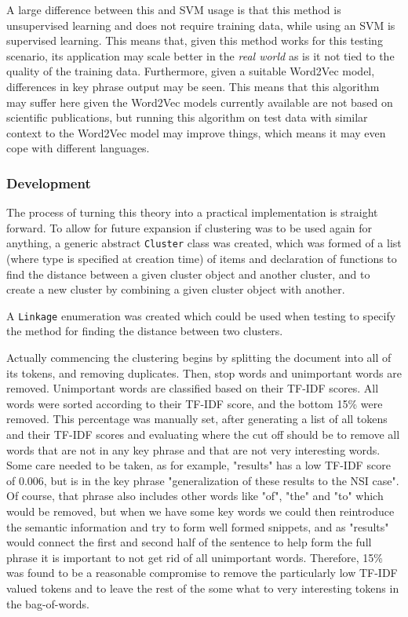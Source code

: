 A large difference between this and SVM usage is that this method is unsupervised learning and does not require training data, while using an SVM is supervised learning. This means that, given this method works for this testing scenario, its application may scale better in the \textit{real world} as is it not tied to the quality of the training data. Furthermore, given a suitable Word2Vec model, differences in key phrase output may be seen. This means that this algorithm may suffer here given the Word2Vec models currently available are not based on scientific publications, but running this algorithm on test data with similar context to the Word2Vec model may improve things, which means it may even cope with different languages.

\subsubsection*{Development}
The process of turning this theory into a practical implementation is straight forward. To allow for future expansion if clustering was to be used again for anything, a generic abstract \texttt{Cluster} class was created, which was formed of a list (where type is specified at creation time) of items and declaration of functions to find the distance between a given cluster object and another cluster, and to create a new cluster by combining a given cluster object with another.

A \texttt{Linkage} enumeration was created which could be used when testing to specify the method for finding the distance between two clusters.

Actually commencing the clustering begins by splitting the document into all of its tokens, and removing duplicates. Then, stop words and unimportant words are removed. Unimportant words are classified based on their TF-IDF scores. All words were sorted according to their TF-IDF score, and the bottom 15\% were removed. This percentage was manually set, after generating a list of all tokens and their TF-IDF scores and evaluating where the cut off should be to remove all words that are not in any key phrase and that are not very interesting words. Some care needed to be taken, as for example, "results" has a low TF-IDF score of 0.006, but is in the key phrase "generalization of these results to the NSI case". Of course, that phrase also includes other words like "of", "the" and "to" which would be removed, but when we have some key words we could then reintroduce the semantic information and try to form well formed snippets, and as "results" would connect the first and second half of the sentence to help form the full phrase it is important to not get rid of all unimportant words. Therefore, 15\% was found to be a reasonable compromise to remove the particularly low TF-IDF valued tokens and to leave the rest of the some what to very interesting tokens in the bag-of-words.

